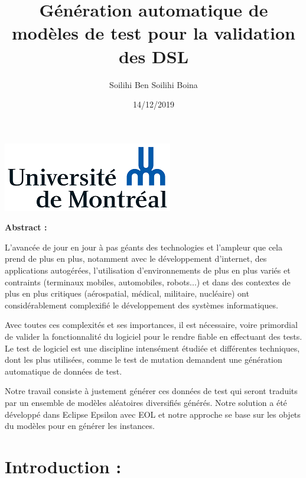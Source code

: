 \documentclass[french]{article}
\title{\Huge Génération automatique de modèles de test pour la validation des DSL}
\author{Soilihi Ben Soilihi Boina}
\date{14/12/2019}
\begin{document}
\includegraphics{images/logo_udem.png}

\maketitle

\newpage

\textbf{Abstract :}

\parindent=1cm
\par
\hspace{10 mm} 
 L'avancée de jour en jour à pas géants des technologies et l'ampleur que cela prend de plus en plus, notamment avec le développement d'internet, des applications autogérées, l'utilisation d'environnements de plus en plus variés et contraints (terminaux mobiles, automobiles, robots...) et dans des contextes de plus en plus critiques (aérospatial, médical, militaire, nucléaire) ont considérablement complexifié le développement des systèmes informatiques.
\par 
Avec toutes ces complexités et ses importances, il est nécessaire, voire primordial de valider la fonctionnalité du logiciel pour le rendre fiable en effectuant des tests. Le test de logiciel est une discipline intensément étudiée et différentes techniques, dont les plus utilisées, comme le test de mutation demandent une génération automatique de données de test. 
\par
Notre travail consiste à justement générer ces données de test qui seront traduits par un ensemble de modèles aléatoires diversifiés générés. Notre solution a été développé dans Eclipse Epsilon avec EOL et notre approche se base sur les objets du modèles pour en générer les instances.

\newpage

\section{Introduction :}
		
\end{document}
